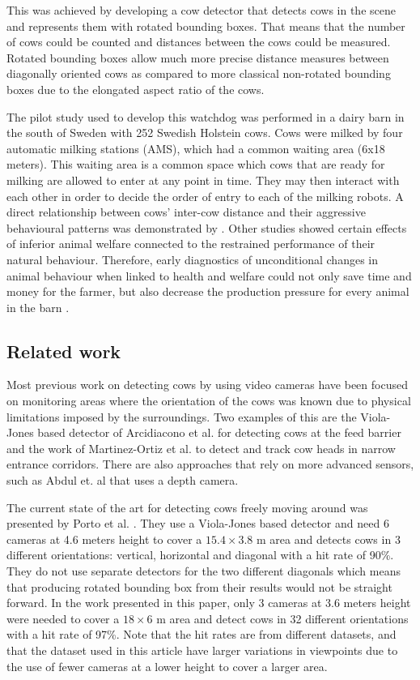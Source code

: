 \documentclass{cta-author}
\begin{document}
This was achieved by developing a cow detector that detects cows in the scene and represents them with
rotated bounding boxes. That means that the number of cows could be counted and distances between the cows
could be measured. Rotated bounding boxes allow much more precise distance measures between diagonally
oriented cows as compared to more classical non-rotated bounding boxes due to the elongated aspect ratio of
the cows.

The pilot study used to develop this watchdog was performed in a dairy barn in the south of Sweden with 252
Swedish Holstein cows. Cows were milked by four automatic milking stations (AMS), which had a common waiting area
(6x18 meters). This waiting area is a common space which cows that are ready for milking are allowed to enter
at any point in time. They may then interact with each other in order to decide the order of entry to each of
the milking robots. A direct relationship between cows' inter-cow distance and their aggressive behavioural
patterns was demonstrated by \cite{DeVriesetal2004}. Other studies \cite{Hemsworth2003, Kilgour2012,
guzhva2016feasibility} showed certain effects of inferior animal welfare connected to the restrained
performance of their natural behaviour. Therefore, early diagnostics of unconditional changes in animal
behaviour when linked to health and welfare could not only save time and money for the farmer, but also
decrease the production pressure for every animal in the barn \cite{Polikarpusetal2015}.

\subsection{Related work}
Most previous work on detecting cows by using video cameras have been focused on monitoring areas where the
orientation of the cows was known due to physical limitations imposed by the surroundings. Two examples of
this are the Viola-Jones based detector of Arcidiacono et al. \cite{Arcidiacono2012} for detecting cows at
the feed barrier and the work of Martinez-Ortiz et al. \cite{martinez2013video} to detect and track cow heads
in narrow entrance corridors. There are also approaches that rely on more advanced sensors, such as Abdul et.
al \cite{abdul2016locomotion} that uses a depth camera.

The current state of the art for detecting cows freely moving around was presented by Porto et al.
\cite{porto2015automatic}. They use a Viola-Jones based detector and need
6 cameras at 4.6 meters height to cover a $15.4 \times 3.8$ m area and detects cows in 3 different
orientations: vertical, horizontal and diagonal with a hit rate of 90\%. They do not use separate detectors
for the two different diagonals which means that producing rotated bounding box from their results would not
be straight forward. In the work presented in this paper, only 3 cameras at 3.6 meters height were needed to
cover a $18 \times 6$ m area and detect cows in 32 different orientations with a hit rate of 97\%. Note that
the hit rates are from different datasets, and that the dataset used in this article have larger variations
in viewpoints due to the use of fewer cameras at a lower height to cover a larger area.
\end{document}
